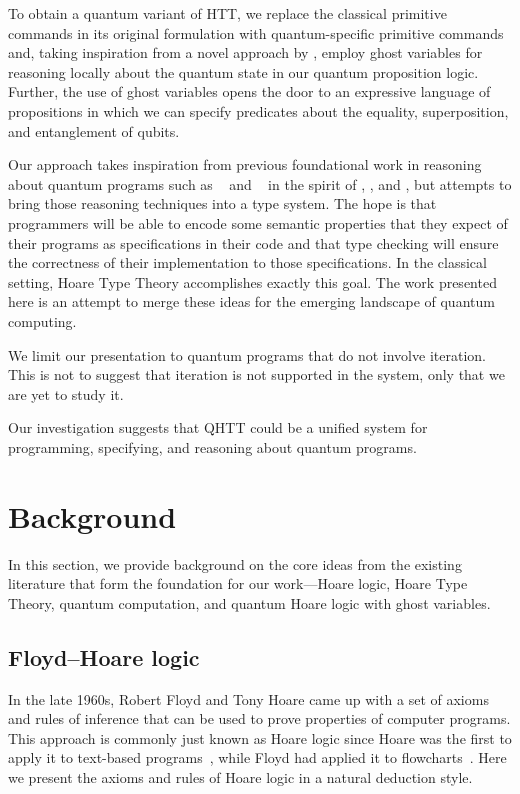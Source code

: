 To obtain a quantum variant of HTT, we replace the classical primitive commands in its original formulation with quantum-specific primitive commands and, taking inspiration from a novel approach by \textcite{unruh2019}, employ ghost variables for reasoning locally about the quantum state in our quantum proposition logic. Further, the use of ghost variables opens the door to an expressive language of propositions in which we can specify predicates about the equality, superposition, and entanglement of qubits.

Our approach takes inspiration from previous foundational work in reasoning about quantum programs such as ~\parencite{dhondt2006} and ~\parencite{floydhoare2012} in the spirit of \textcite{hoare1969}, \textcite{dijkstra1976}, and \textcite{gries1981}, but attempts to bring those reasoning techniques into a type system. The hope is that programmers will be able to encode some semantic properties that they expect of their programs as specifications in their code and that type checking will ensure the correctness of their implementation to those specifications. In the classical setting, Hoare Type Theory accomplishes exactly this goal. The work presented here is an attempt to merge these ideas for the emerging landscape of quantum computing.

We limit our presentation to quantum programs that do not involve iteration. This is not to suggest that iteration is not supported in the system, only that we are yet to study it.

Our investigation suggests that QHTT could be a unified system for programming, specifying, and reasoning about quantum programs.

\section{Background}
In this section, we provide background on the core ideas from the existing literature that form the foundation for our work---Hoare logic, Hoare Type Theory, quantum computation, and quantum Hoare logic with ghost variables.

\subsection{Floyd--Hoare logic}
In the late 1960s, Robert Floyd and Tony Hoare came up with a set of axioms and rules of inference that can be used to prove properties of computer programs. This approach is commonly just known as Hoare logic since Hoare was the first to apply it to text-based programs~\parencite{hoare1969}, while Floyd had applied it to flowcharts~\parencite{floyd67}. Here we present the axioms and rules of Hoare logic in a natural deduction style.

